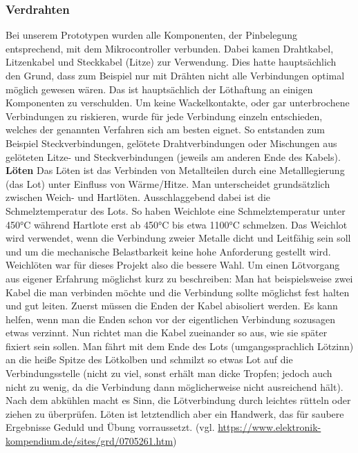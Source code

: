\documentclass[]{article}
\begin{document}
\subsubsection{Verdrahten}
Bei unserem Prototypen wurden alle Komponenten, der Pinbelegung entsprechend, mit dem Mikrocontroller verbunden. Dabei kamen Drahtkabel, Litzenkabel und Steckkabel (Litze) zur Verwendung. Dies hatte hauptsächlich den Grund, dass zum Beispiel nur mit Drähten nicht alle Verbindungen optimal möglich gewesen wären. Das ist hauptsächlich der Löthaftung an einigen Komponenten zu verschulden. Um keine Wackelkontakte, oder gar unterbrochene Verbindungen zu riskieren, wurde für jede Verbindung einzeln entschieden, welches der genannten Verfahren sich am besten eignet. So entstanden zum Beispiel Steckverbindungen, gelötete Drahtverbindungen oder Mischungen aus gelöteten Litze- und Steckverbindungen (jeweils am anderen Ende des Kabels).
\vspace{4mm}\newline
\textbf{Löten}\newline
\glqq Das Löten ist das Verbinden von Metallteilen durch eine Metalllegierung (das Lot) unter Einfluss von Wärme/Hitze.\grqq{} \newline
Man unterscheidet grundsätzlich zwischen Weich- und Hartlöten. Ausschlaggebend dabei ist die Schmelztemperatur des Lots. So haben Weichlote eine Schmelztemperatur unter 450°C während Hartlote erst ab 450°C bis etwa 1100°C schmelzen. \glqq Das Weichlot wird verwendet, wenn die Verbindung zweier Metalle dicht und Leitfähig sein soll und um die mechanische Belastbarkeit keine hohe Anforderung gestellt wird. \grqq{} Weichlöten war für dieses Projekt also die bessere Wahl. \newline
Um einen Lötvorgang aus eigener Erfahrung möglichst kurz zu beschreiben:\newline
Man hat beispielsweise zwei Kabel die man verbinden möchte und die Verbindung sollte möglichst fest halten und gut leiten. Zuerst müssen die Enden der Kabel abisoliert werden. Es kann helfen, wenn man die Enden schon vor der eigentlichen Verbindung sozusagen etwas \glqq verzinnt\grqq{}. Nun richtet man die Kabel zueinander so aus, wie sie später fixiert sein sollen. Man fährt mit dem Ende des Lots (umgangssprachlich Lötzinn) an die heiße Spitze des Lötkolben und schmilzt so etwas Lot auf die Verbindungsstelle (nicht zu viel, sonst erhält man dicke Tropfen; jedoch auch nicht zu wenig, da die Verbindung dann möglicherweise nicht ausreichend hält). Nach dem abkühlen macht es Sinn, die Lötverbindung durch leichtes rütteln oder ziehen zu überprüfen. Löten ist letztendlich aber ein Handwerk, das für saubere Ergebnisse Geduld und Übung vorraussetzt.
\vspace{4mm}\newline
(vgl. \url{https://www.elektronik-kompendium.de/sites/grd/0705261.htm})
\end{document}
